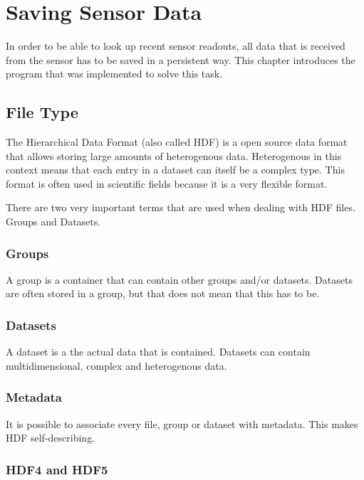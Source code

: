 \chapter{Saving Sensor Data}
\label{ch:faps-save}

\author{Nico Kratky}
%
In order to be able to look up recent sensor readouts, all data that is received from the sensor has to be saved in a persistent way. This chapter introduces the program that was implemented to solve this task.

\section{File Type}

The Hierarchical Data Format (also called HDF) is a open source data format that allows storing large amounts of heterogenous data. Heterogenous in this context means that each entry in a dataset can itself be a complex type. This
format is often used in scientific fields because it is a very flexible format.

There are two very important terms that are used when dealing with HDF files. Groups and Datasets.

\subsection{Groups}

A group is a container that can contain other groups and/or datasets. Datasets are often stored in a group, but that does not mean that this has to be.

\subsection{Datasets}

A dataset is a the actual data that is contained. Datasets can contain multidimensional, complex and heterogenous data.

\subsection{Metadata}

It is possible to associate every file, group or dataset with metadata. This makes HDF self-describing.

\subsection{HDF4 and HDF5}

